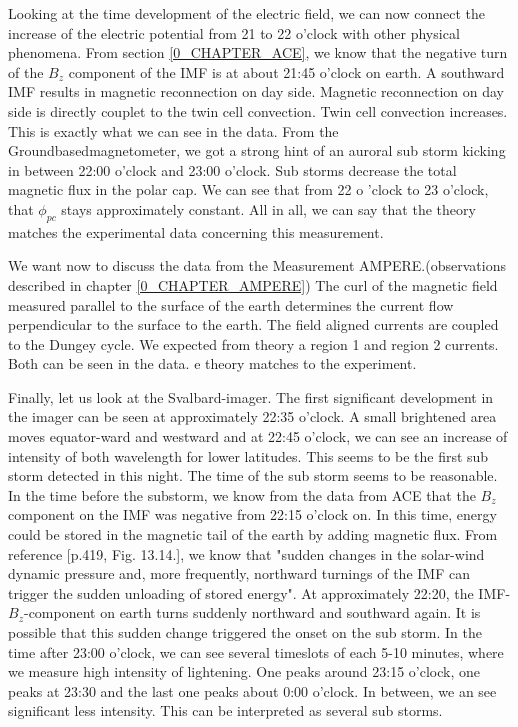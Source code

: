 \documentclass[10pt,a4paper]{article}
\begin{document}
Looking at the time development of the electric field, we can now connect the increase of the electric potential from 21 to 22 o'clock with other physical phenomena. From section \ref{0_CHAPTER_ACE}, we know that the negative turn of the $B_z$ component of the IMF is at about 21:45 o'clock on earth. A southward IMF results in magnetic reconnection on day side. Magnetic reconnection on day side is directly couplet to the twin cell convection. Twin cell convection increases. This is exactly what we can see in the data. From the Groundbasedmagnetometer, we got a strong  hint of an auroral sub storm kicking in between 22:00 o'clock and 23:00 o'clock. Sub storms decrease the total magnetic flux in the polar cap. We can see that from 22 o 'clock to 23 o'clock, that $\phi_{pc}$ stays approximately constant. 
All in all, we can say that the theory matches the experimental data concerning this measurement. 

We want now to discuss the data from the Measurement AMPERE.(observations described in chapter \ref{0_CHAPTER_AMPERE}) The  curl of the magnetic field measured parallel to the surface of the earth determines the current flow perpendicular to the surface to the earth. 
The field aligned currents are coupled to the Dungey cycle. We expected from theory a region 1 and region 2 currents. Both can be seen in the data. e theory matches to the experiment.

Finally, let us look at the Svalbard-imager. The first significant development in the imager can be seen at approximately 22:35 o'clock. A small brightened area moves equator-ward and westward and at 22:45 o'clock, we can see an increase of intensity of both wavelength for lower latitudes. This seems to be the first sub storm detected in this night. The time of the sub storm seems to be reasonable. In the time before the substorm, we know from the data from ACE that the $B_z$ component on the IMF was negative from 22:15 o'clock on. In this time, energy could be stored in the magnetic tail of the earth by adding magnetic flux. From reference \cite{Buch2}[p.419, Fig. 13.14.], we know that "sudden changes in the solar-wind dynamic pressure and, more frequently, northward turnings of the IMF can trigger the sudden unloading of stored energy". At approximately 22:20, the IMF-$B_z$-component on earth turns suddenly northward and southward again. It is possible that this sudden change triggered the onset on the sub storm. 
In the time after 23:00 o'clock, we can see several timeslots of each 5-10 minutes, where we measure high intensity of lightening. One peaks around 23:15 o'clock, one peaks at 23:30 and the last one peaks about 0:00 o'clock. In between, we an see significant less intensity. This can be interpreted as several sub storms. 
\end{document}
